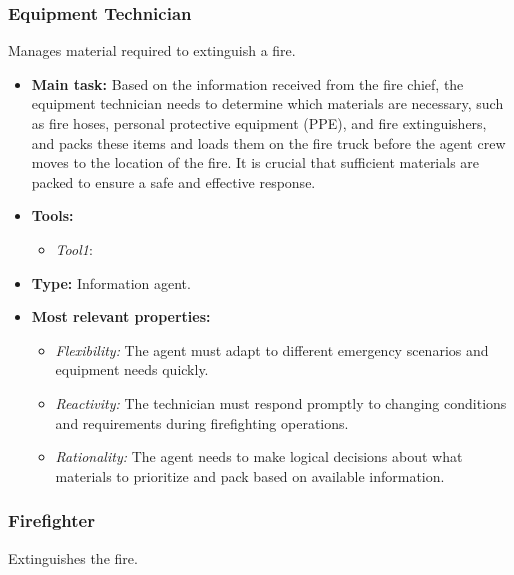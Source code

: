 \subsubsection{Equipment Technician}
Manages material required to extinguish a fire.

\begin{itemize}
    \item \textbf{Main task:}  Based on the information received from the fire chief, the equipment technician needs to determine which materials are necessary, such as fire hoses, personal protective equipment (PPE), and fire extinguishers, and packs these items and loads them on the fire truck before the agent crew moves to the location of the fire. It is crucial that sufficient materials are packed to ensure a safe and effective response.
    \item \textbf{Tools:}
    \begin{itemize}
        \item \textit{Tool1}:
    \end{itemize}
    \item \textbf{Type:} Information agent.
    \item \textbf{Most relevant properties:}
    \begin{itemize}
        \item \textit{Flexibility:} The agent must adapt to different emergency scenarios and equipment needs quickly.
        \item \textit{Reactivity:} The technician must respond promptly to changing conditions and requirements during firefighting operations.
        \item \textit{Rationality:} The agent needs to make logical decisions about what materials to prioritize and pack based on available information.
    \end{itemize}
\end{itemize}

\subsubsection{Firefighter}
Extinguishes the fire.

